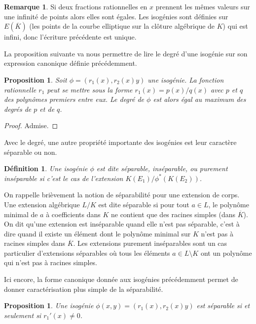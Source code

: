 \documentclass{article}
\theoremstyle{plain}%
\newtheorem{prop}[thm]{Proposition}
\newtheorem{deff}[thm]{Définition}
\theoremstyle{definition}%
\newtheorem{rem}[thm]{Remarque}
\begin{document}
\begin{rem}
  Si deux fractions rationnelles en $x$ prennent les mêmes valeurs sur une infinité de points alors elles sont égales. Les isogénies sont définies sur $E(\overline{K})$ (les points de la courbe elliptique sur la clôture algébrique de $K$) qui est infini, donc l'écriture précédente est unique.
\end{rem}

La proposition suivante va nous permettre de lire le degré d'une isogénie sur son expression canonique définie précédemment.

\begin{prop}
  \label{caracdeg}
  Soit $\phi = (r_1(x), r_2(x)y)$ une isogénie. La fonction rationnelle $r_1$ peut se mettre sous la forme $r_1(x) = p(x) / q(x)$ avec $p$ et $q$ des polynômes premiers entre eux. Le degré de $\phi$ est alors égal au maximum des degrés de $p$ et de $q$. 
\end{prop}

\begin{proof}
  Admise. 
\end{proof}

Avec le degré, une autre propriété importante des isogénies est leur caractère séparable ou non.

\begin{deff}
  Une isogénie $\phi$ est dite séparable, inséparable, ou purement inséparable si c'est le cas de l'extension $K(E_1) / \phi^*(K(E_2))$.
\end{deff}

On rappelle brièvement la notion de séparabilité pour une extension de corps. Une extension algébrique $L/K$ est dite séparable si pour tout $a\in L$, le polynôme minimal de $a$ à coefficients dans $K$ ne contient que des racines simples (dans $\overline{K}$). On dit qu'une extension est inséparable quand elle n'est pas séparable, c'est à dire quand il existe un élément dont le polynôme minimal sur $K$ n'est pas à racines simples dans $\overline{K}$. Les extensions purement inséparables sont un cas particulier d'extensions séparables où tous les éléments $a\in L \setminus K$ ont un polynôme qui n'est pas à racines simples.

Ici encore, la forme canonique donnée aux isogénies précédemment permet de donner caractérisation plus simple de la séparabilité.

\begin{prop}
  \label{caracsep}
  Une isogénie $\phi(x, y) = (r_1(x), r_2(x)y)$ est séparable si et seulement si $r_1'(x) \neq 0$.
\end{prop}
\end{document}
